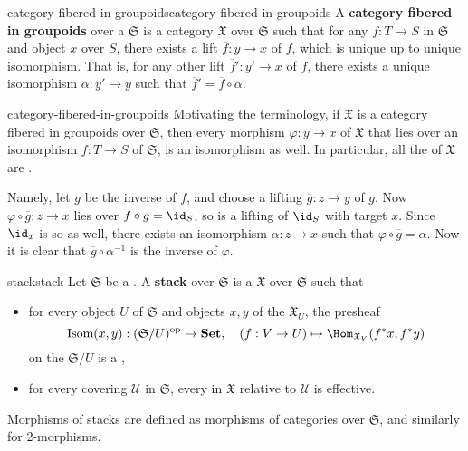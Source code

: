 \begin{topic}{category-fibered-in-groupoids}{category fibered in groupoids}
    A \textbf{category fibered in groupoids} over a  $\mathfrak{S}$ is a category $\mathfrak{X}$ over $\mathfrak{S}$ such that for any $f : T \to S$ in $\mathfrak{S}$ and object $x$ over $S$, there exists a lift $\overline{f} : y \to x$ of $f$, which is unique up to unique isomorphism. That is, for any other lift $\overline{f}' : y' \to x$ of $f$, there exists a unique isomorphism $\alpha : y' \to y$ such that $\overline{f}' = \overline{f} \circ \alpha$.
\end{topic}

\begin{example}{category-fibered-in-groupoids}
    Motivating the terminology, if $\mathfrak{X}$ is a category fibered in groupoids over $\mathfrak{S}$, then every morphism $\varphi : y \to x$ of $\mathfrak{X}$ that lies over an isomorphism $f : T \to S$ of $\mathfrak{S}$, is an isomorphism as well. In particular, all the  of $\mathfrak{X}$ are .

    Namely, let $g$ be the inverse of $f$, and choose a lifting $\overline{g} : z \to y$ of $g$. Now $\varphi \circ \overline{g} : z \to x$ lies over $f \circ g = \id_S$, so is a lifting of $\id_S$ with target $x$. Since $\id_x$ is so as well, there exists an isomorphism $\alpha : z \to x$ such that $\varphi \circ \overline{g} = \alpha$. Now it is clear that $\overline{g} \circ \alpha^{-1}$ is the inverse of $\varphi$.
\end{example}

\begin{topic}{stack}{stack}
    Let $\mathfrak{S}$ be a . A \textbf{stack} over $\mathfrak{S}$ is a  $\mathfrak{X}$ over $\mathfrak{S}$ such that
    \begin{itemize}
        \item for every object $U$ of $\mathfrak{S}$ and objects $x, y$ of the  $\mathfrak{X}_U$, the presheaf
        \[ \textup{Isom}(x, y) : (\mathfrak{S}/U)^\textup{op} \to \textbf{Set}, \quad (f : V \to U) \mapsto \Hom_{\mathfrak{X}_V}(f^* x, f^* y) \]
        on the  $\mathfrak{S}/U$ is a ,
        \item for every covering $\mathcal{U}$ in $\mathfrak{S}$, every  in $\mathfrak{X}$ relative to $\mathcal{U}$ is effective.
    \end{itemize}
    Morphisms of stacks are defined as morphisms of categories over $\mathfrak{S}$, and similarly for 2-morphisms.
\end{topic}

